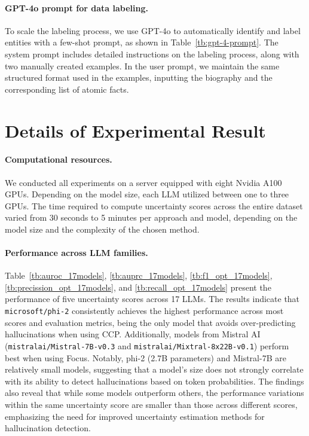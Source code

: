 \paragraph{GPT-4o prompt for data labeling.}

To scale the labeling process, we use GPT-4o to automatically identify and label entities with a few-shot prompt, as shown in Table~\ref{tb:gpt-4-prompt}. The system prompt includes detailed instructions on the labeling process, along with two manually created examples. In the user prompt, we maintain the same structured format used in the examples, inputting the biography and the corresponding list of atomic facts.





\section{Details of Experimental Result}\label{ap:experiment}

\paragraph{Computational resources.}
We conducted all experiments on a server equipped with eight Nvidia A100 GPUs. Depending on the model size, each LLM utilized between one to three GPUs. The time required to compute uncertainty scores across the entire dataset varied from 30 seconds to 5 minutes per approach and model, depending on the model size and the complexity of the chosen method.

\paragraph{Performance across LLM families.}

Table~\ref{tb:auroc_17models}, \ref{tb:auprc_17models}, \ref{tb:f1_opt_17models}, \ref{tb:precission_opt_17models}, and \ref{tb:recall_opt_17models} present the performance of five uncertainty scores across 17 LLMs. The results indicate that \texttt{microsoft/phi-2} consistently achieves the highest performance across most scores and evaluation metrics, being the only model that avoids over-predicting hallucinations when using CCP. Additionally, models from Mistral AI (\texttt{mistralai/Mistral-7B-v0.3} and \texttt{mistralai/Mixtral-8x22B-v0.1}) perform best when using Focus. Notably, phi-2 (2.7B parameters) and Mistral-7B are relatively small models, suggesting that a model's size does not strongly correlate with its ability to detect hallucinations based on token probabilities. The findings also reveal that while some models outperform others, the performance variations within the same uncertainty score are smaller than those across different scores, emphasizing the need for improved uncertainty estimation methods for hallucination detection.





